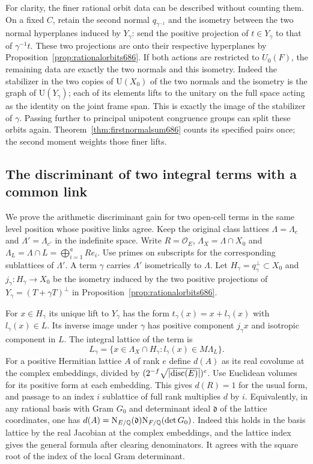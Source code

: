 \documentclass[a4paper,11pt]{article}
\theoremstyle{definition}
\theoremstyle{remark}
\numberwithin{equation}{section}
\begin{document}
For clarity, the finer rational orbit data can be described
without counting them. On a fixed \(C\), retain the second
normal \(q_{\gamma^{-1}}\) and the isometry between the two
normal hyperplanes induced by \(Y_\gamma\): send the positive
projection of \(t\in Y_\gamma\) to that of \(\gamma^{-1}t\).
These two projections are onto their respective hyperplanes
by Proposition~\ref{prop:rationalorbits686}. If both actions
are restricted to \(U_0(F)\), the remaining data are exactly
the two normals and this isometry. Indeed the stabilizer in
the two copies of \(\mathrm U(X_0)\) of the two normals and
the isometry is the graph of \(\mathrm U(Y_\gamma)\); each of
its elements lifts to the unitary on the full space acting
as the identity on the joint frame span. This is exactly the
image of the stabilizer of \(\gamma\). Passing further to
principal unipotent congruence groups can split these orbits
again. Theorem~\ref{thm:firstnormalsum686} counts its specified
pairs once; the second moment weights those finer lifts.


\subsection{The discriminant of two integral terms with a common link}
\label{sec:linkdisc687}

We prove the arithmetic discriminant gain for two open-cell
terms in the same level position whose positive links agree.
Keep the original class lattices \(\Lambda=\Lambda_c\) and
\(\Lambda'=\Lambda_{c'}\) in the indefinite space. Write
\(R=\mathcal O_E\), \(\Lambda_X=\Lambda\cap X_0\) and
\(\Lambda_L=\Lambda\cap L=\bigoplus_{i=1}^a R e_i\).
Use primes on subscripts for the corresponding sublattices of
\(\Lambda'\). A term \(\gamma\) carries \(\Lambda'\) isometrically
to \(\Lambda\). Let \(H_\gamma=q_\gamma^\perp\subset X_0\)
and \(j_\gamma:H_\gamma\to X_0\) be the isometry induced by the
two positive projections of \(Y_\gamma=(T+\gamma T)^\perp\)
in Proposition~\ref{prop:rationalorbits686}.

For \(x\in H_\gamma\) its unique lift to \(Y_\gamma\) has the
form \(t_\gamma(x)=x+l_\gamma(x)\) with \(l_\gamma(x)\in L\).
Its inverse image under \(\gamma\) has positive component
\(j_\gamma x\) and isotropic component in \(L\).
The integral lattice of the term is
\[
 L_\gamma=\{x\in\Lambda_X\cap H_\gamma:
                         l_\gamma(x)\in M\Lambda_L\}.
\]
For a positive Hermitian lattice \(A\) of rank \(e\) define
\(d(A)\) as its real covolume at the complex embeddings, divided
by \((2^{-f}\sqrt{|{\rm disc}(E)|})^e\). Use Euclidean volumes
for its positive form at each embedding. This gives \(d(R)=1\)
for the usual form, and passage to an index \(i\) sublattice of
full rank multiplies \(d\) by \(i\). Equivalently, in any
rational basis with Gram \(G_0\) and determinant ideal
\(\mathfrak d\) of the lattice coordinates, one has
\(d(A)={\rm N}_{E/\mathbb Q}(\mathfrak d)
       {\rm N}_{F/\mathbb Q}(\det G_0)\).
Indeed this holds in the basis lattice by the real Jacobian
at the complex embeddings, and the lattice index gives the
general formula after clearing denominators. It agrees with
the square root of the index of the local Gram determinant.
\end{document}
